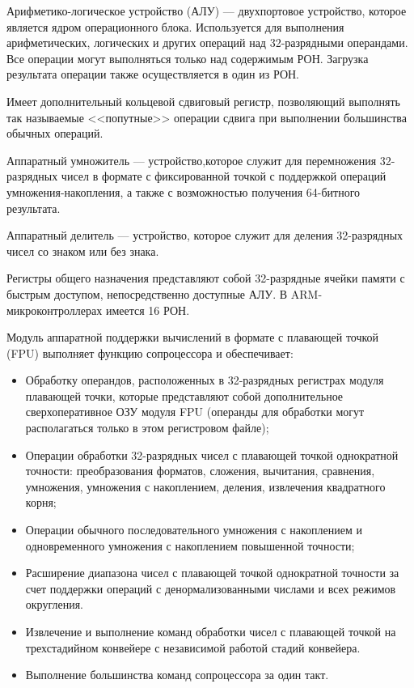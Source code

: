 \documentclass[12pt, oneside]{altsu-report}
\begin{document}
Арифметико-логическое устройство (АЛУ) --- двухпортовое устройство, которое является ядром операционного блока. Используется для выполнения арифметических, логических и других операций над 32-разрядными операндами. Все операции могут выполняться только над содержимым РОН. Загрузка результата операции также осуществляется в один из РОН.

Имеет дополнительный кольцевой сдвиговый регистр, позволяющий выполнять так называемые <<попутные>> операции сдвига при выполнении большинства обычных операций.

Аппаратный умножитель --- устройство,которое служит для перемножения 32-разрядных чисел в формате с фиксированной точкой с поддержкой операций умножения-накопления, а также с возможностью получения 64-битного результата.

Аппаратный делитель --- устройство, которое служит для деления 32-разрядных чисел со знаком или без знака.

Регистры общего назначения представляют собой 32-разрядные ячейки памяти с быстрым доступом, непосредственно доступные АЛУ. В ARM-микроконтроллерах имеется 16 РОН.

Модуль аппаратной поддержки вычислений в формате с плавающей точкой (FPU) выполняет функцию сопроцессора и обеспечивает:

\begin{itemize}
    \item Обработку операндов, расположенных в 32-разрядных регистрах модуля плавающей точки, которые представляют собой дополнительное сверхоперативное ОЗУ модуля FPU (операнды для обработки могут располагаться только в этом регистровом файле);

    \item Операции обработки 32-разрядных чисел с плавающей точкой однократной точности: преобразования форматов, сложения, вычитания, сравнения, умножения, умножения с накоплением, деления, извлечения квадратного корня;

    \item Операции обычного последовательного умножения с накоплением и одновременного умножения с накоплением повышенной точности;

    \item Расширение диапазона чисел с плавающей точкой однократной точности за счет поддержки операций с денормализованными числами и всех режимов округления.

    \item Извлечение и выполнение команд обработки чисел с плавающей точкой на трехстадийном конвейере с независимой работой стадий конвейера.

    \item Выполнение большинства команд сопроцессора за один такт.
\end{itemize}
\end{document}

